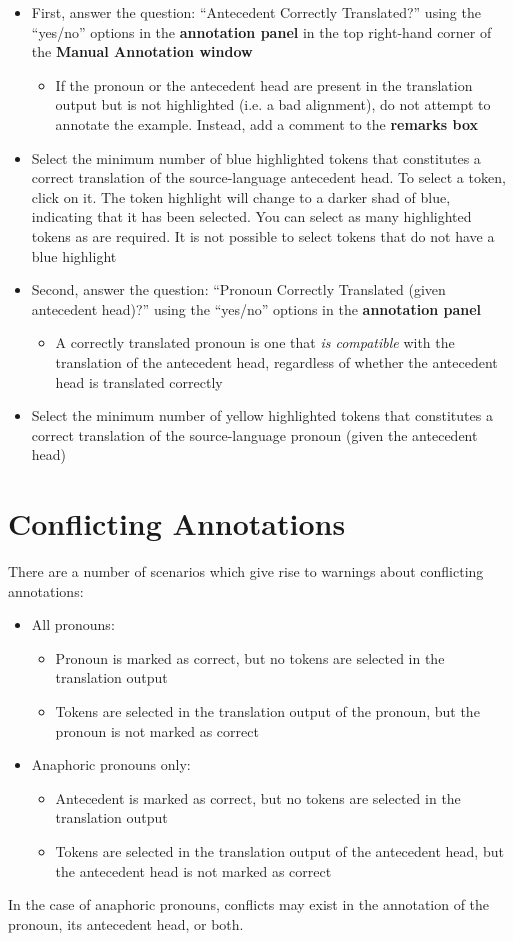 \documentclass[11pt]{article} %
\begin{document}
\begin{itemize}
  \item First, answer the question: ``Antecedent Correctly Translated?'' using the ``yes/no'' options in the \textbf{annotation panel} in the top right-hand corner of the \textbf{Manual Annotation window}
  \begin{itemize}
    \item If the pronoun or the antecedent head are present in the translation output but is not highlighted (i.e. a bad alignment), do not attempt to annotate the example. Instead, add a comment to the \textbf{remarks box}
  \end{itemize}  
  \item Select the minimum number of blue highlighted tokens that constitutes a correct translation of the source-language antecedent head. To select a token, click on it. The token highlight will change to a darker shad of blue, indicating that it has been selected. You can select as many highlighted tokens as are required. It is not possible to select tokens that do not have a blue highlight
  \item Second, answer the question: ``Pronoun Correctly Translated (given antecedent head)?'' using the ``yes/no'' options in the \textbf{annotation panel}
  \begin{itemize}
    \item A correctly translated pronoun is one that \textit{is compatible} with the translation of the antecedent head, regardless of whether the antecedent head is translated correctly
  \end{itemize}
  \item Select the minimum number of yellow highlighted tokens that constitutes a correct translation of the source-language pronoun (given the antecedent head)
\end{itemize}


\section{Conflicting Annotations}
\label{ConflictingAnnotations}
There are a number of scenarios which give rise to warnings about conflicting annotations:
\begin{itemize}
  \item All pronouns:
  \begin{itemize}
    \item Pronoun is marked as correct, but no tokens are selected in the translation output
    \item Tokens are selected in the translation output of the pronoun, but the pronoun is not marked as correct
  \end{itemize}
  \item Anaphoric pronouns only:
  \begin{itemize}
    \item Antecedent is marked as correct, but no tokens are selected in the translation output
    \item Tokens are selected in the translation output of the antecedent head, but the antecedent head is not marked as correct 
  \end{itemize}
\end{itemize}

In the case of anaphoric pronouns, conflicts may exist in the annotation of the pronoun, its antecedent head, or both.
\end{document}
